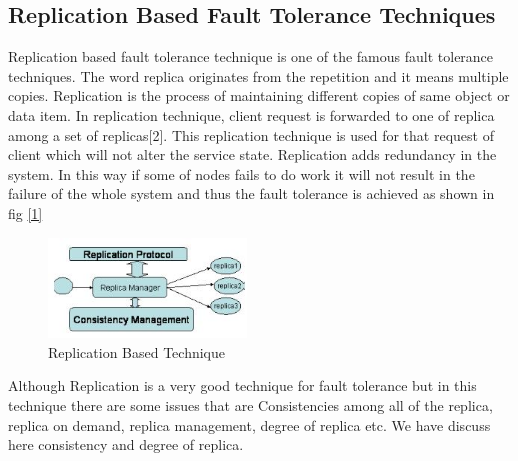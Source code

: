 \documentclass{article}
\begin{document}
\subsection{Replication Based Fault Tolerance Techniques}
Replication based fault tolerance technique is one of the famous fault tolerance techniques. The word replica originates from the repetition and it means multiple copies. Replication is the process of maintaining different copies of same object or data item. In replication technique, client request is forwarded to one of replica among a set of replicas[2]. This replication technique is used for that request of client which will not alter the service state. Replication adds redundancy in the system. In this way if some of nodes fails to do work it will not result in the failure of the whole system and thus the fault tolerance is achieved as shown in fig \ref{1}

\begin{figure}
    \centering
    \includegraphics[width=0.47\textwidth]{../figz/replication}
    \caption{Replication Based Technique}
    \label{fig:1}
\end{figure}

Although Replication is a very good technique for fault tolerance but in this technique there are some issues that are Consistencies among all of the replica, replica on demand, replica management, degree of replica etc. We have discuss here consistency and degree of replica.
\end{document}
